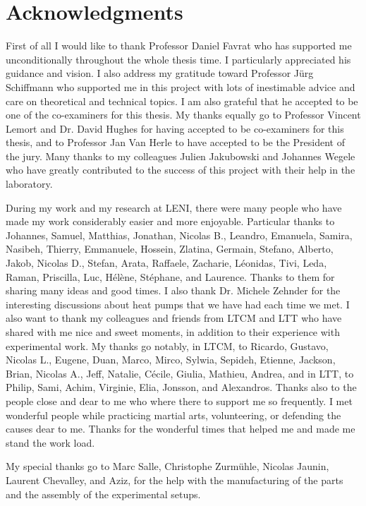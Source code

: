 \section*{Acknowledgments}
\label{sec:thanks}

First of all I would like to thank Professor Daniel Favrat who has
supported me unconditionally throughout the whole thesis time. I
particularly appreciated his guidance and vision. I also address my
gratitude toward Professor Jürg Schiffmann who supported me in this
project with lots of inestimable advice and care on theoretical and
technical topics. I am also grateful that he accepted to be one of the
co-examiners for this thesis. My thanks equally go to Professor
Vincent Lemort and Dr. David Hughes for having accepted to be
co-examiners for this thesis, and to Professor Jan Van Herle to have
accepted to be the President of the jury. Many thanks to my colleagues
Julien Jakubowski and Johannes Wegele who have greatly contributed to
the success of this project with their help in the laboratory.

During my work and my research at LENI, there were many people who
have made my work considerably easier and more enjoyable. Particular
thanks to Johannes, Samuel, Matthias, Jonathan, Nicolas B., Leandro,
Emanuela, Samira, Nasibeh, Thierry, Emmanuele, Hossein, Zlatina,
Germain, Stefano, Alberto, Jakob, Nicolas D., Stefan, Arata, Raffaele,
Zacharie, Léonidas, Tivi, Leda, Raman, Priscilla, Luc, Hélène,
Stéphane, and Laurence. Thanks to them for sharing many ideas and good
times. I also thank Dr. Michele Zehnder for the interesting
discussions about heat pumps that we have had each time we met. I also
want to thank my colleagues and friends from LTCM and LTT who have
shared with me nice and sweet moments, in addition to their experience
with experimental work. My thanks go notably, in LTCM, to Ricardo,
Gustavo, Nicolas L., Eugene, Duan, Marco, Mirco, Sylwia, Sepideh,
Etienne, Jackson, Brian, Nicolas A., Jeff, Natalie, Cécile, Giulia,
Mathieu, Andrea, and in LTT, to Philip, Sami, Achim, Virginie, Elia,
Jonsson, and Alexandros. Thanks also to the people close and dear to
me who where there to support me so frequently. I met wonderful people
while practicing martial arts, volunteering, or defending the causes
dear to me. Thanks for the wonderful times that helped me and made me
stand the work load.

My special thanks go to Marc Salle, Christophe Zurmühle, Nicolas
Jaunin, Laurent Chevalley, and Aziz, for the help with the
manufacturing of the parts and the assembly of the experimental
setups.

